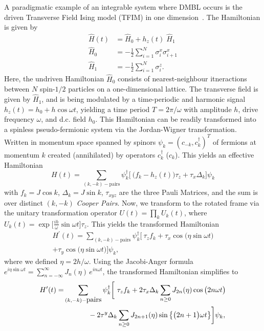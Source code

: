 \documentclass[%
reprint,
superscriptaddress,
amsmath,amssymb,
aps,
prb,
]{revtex4-2}
\begin{document}
	A paradigmatic example of an integrable system where DMBL occurs is  the driven Transverse Field Ising model (TFIM) in one dimension~\cite{stinchcombe_ising_1973}. The Hamiltonian is given by
	\begin{align}
		\label{eq:tfim:hamilt}
		\hat{H}(t) &= \hat{H}_0 + h_z(t) \; \hat{H}_1\\
		\hat{H}_0 &= -\frac{1}{2}\sum^N_{i=1} \sigma^x_i \sigma^x_{i+1}\\
		\hat{H}_1 &= -\frac{1}{2}\sum_{i=1}^N \sigma^z_{i}.
	\end{align}
	Here, the undriven Hamiltonian $\hat{H}_0$ consists of nearest-neighbour itneractions between $N$ spin-$1/2$ particles on a one-dimensional lattice. The transverse field is given by $\hat{H}_1$, and is being modulated by a time-periodic and harmonic signal $h_z(t) = h_0 + h\cos{\omega t}$, yielding a time period $T=2\pi/\omega$ with amplitude $h$, drive frequency $\omega$, and d.c. field $h_0$. This Hamiltonian can be readily transformed into a spinless pseudo-fermionic system via the Jordan-Wigner transformation. Written in momentum space spanned by spinors $\psi_k = (c_{-k}, c^\dagger_k)^T$ of fermions at momentum $k$ created (annihilated) by operators $c^\dagger_k$ ($c_k$). This yields an effective Hamiltonian ~\cite{mbeng_quantum_2020}
	\begin{equation}
		H(t) = \sum_{(k,-k)-\mbox{pairs}} \psi^\dagger_k
		\Bigg[\ \bigg(f_k - h_z(t)\bigg)\tau_z +  \tau_x \Delta_k\Bigg]\psi_k
	\end{equation}
	with $f_k = J\cos{k}$, $\Delta_k = J\sin{k}$, $\tau_{xyz}$ are the three Pauli Matrices, and the sum is over distinct $(k, -k)$ \textit{Cooper Pairs}. Now, we transform to the rotated frame via the unitary transformation operator $U(t) = \prod_k U_k(t)$, where $U_k(t) = \exp{\Big[\frac{i h}{\omega}\sin{\omega t}\Big]\tau_z}$. This yields the transformed Hamiltonian
	\begin{multline*}
		H^\prime(t) = \sum_{(k,-k)-\mbox{pairs}} \psi^\dagger_k
		\bigg[\ \tau_z f_k + \tau_x \cos{\big(\eta\sin{\omega t}\big)}  \\
		+ \tau_y \cos{\big(\eta\sin{\omega t}\big)}\bigg]\psi_k,
	\end{multline*}
	where we defined $\eta=2h/\omega$. Using the Jacobi-Anger formula $e^{i \eta \sin{\omega t}} = \sum_{n=-\infty}^{\infty} J_n(\eta)\, e^{i n \omega t}$, the transformed Hamiltonian simplifies to \\
	\begin{align}
		H^\prime(t) =& \sum_{(k,-k)-\mbox{pairs}} \psi^\dagger_k
		\bigg[\ \tau_z f_k + 2\tau_x \Delta_k \sum_{n\geq 0} J_{2n}(\eta)\cos{\big(2n\omega t\big)} \nonumber\\
		&\hskip 1.2cm- 2\tau^y\Delta_k \sum_{n\geq 0} J_{2n+1}(\eta)\sin{\big\{\big(2n+1\big)\omega t\big\}}   \bigg]\psi_k,
	\end{align}\\
\end{document}
